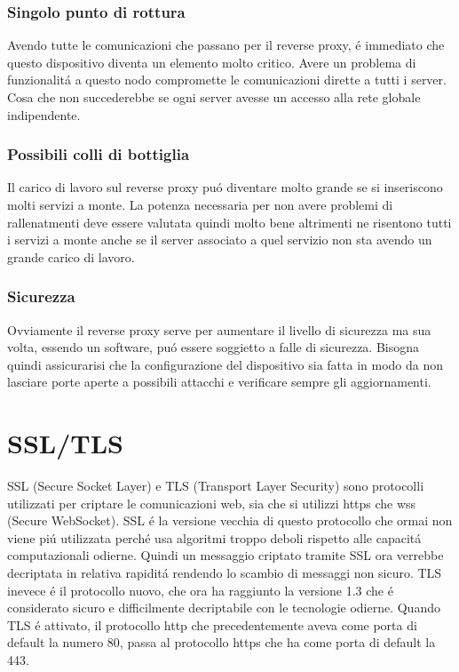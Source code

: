 \subsubsection{Singolo punto di rottura}
Avendo tutte le comunicazioni che passano per il reverse proxy, é immediato che questo dispositivo diventa un elemento molto critico. Avere un problema di funzionalitá a questo nodo compromette le comunicazioni dirette a tutti i server. Cosa che non succederebbe se ogni server avesse un accesso alla rete globale indipendente.
\subsubsection{Possibili colli di bottiglia}
Il carico di lavoro sul reverse proxy puó diventare molto grande se si inseriscono molti servizi a monte. La potenza necessaria per non avere problemi di rallenatmenti deve essere valutata quindi molto bene altrimenti ne risentono tutti i servizi a monte anche se il server associato a quel servizio non sta avendo un grande carico di lavoro.
\subsubsection{Sicurezza}
Ovviamente il reverse proxy serve per aumentare il livello di sicurezza ma sua volta, essendo un software, puó essere soggietto a falle di sicurezza. Bisogna quindi assicurarisi che la configurazione del dispositivo sia fatta in modo da non lasciare porte aperte a possibili attacchi e verificare sempre gli aggiornamenti.



\section{SSL/TLS}
\cite{tls}SSL (Secure Socket Layer) e TLS (Transport Layer Security) sono protocolli utilizzati per criptare le comunicazioni web, sia che si utilizzi https che wss (Secure WebSocket). SSL é la versione vecchia di questo protocollo che ormai non viene piú utilizzata perché usa algoritmi troppo deboli rispetto alle capacitá computazionali odierne. Quindi un messaggio criptato tramite SSL ora verrebbe decriptata in relativa rapiditá rendendo lo scambio di messaggi non sicuro. TLS inevece é il protocollo nuovo, che ora ha raggiunto la versione 1.3 che é considerato sicuro e difficilmente decriptabile con le tecnologie odierne. Quando TLS é attivato, il protocollo http che precedentemente aveva come porta di default la numero 80, passa al protocollo https che ha come porta di default la 443.
